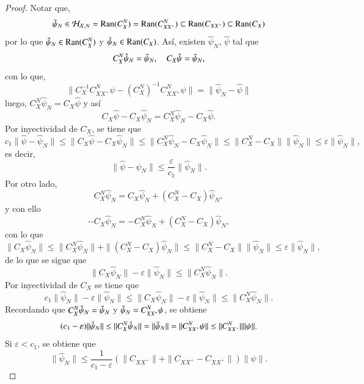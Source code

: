 \begin{proof}
    Notar que,
    \[
    \Tilde{\psi}_N \in 
   \mathcal{H}_{\mathcal{X}, N} = \text{Ran}(C_{X}^N) = \text{Ran}(C_{XX^+}^N) \subseteq \text{Ran}(C_{XX^+}) \subseteq \text{Ran}(C_X)
    \]
    por lo que $\Tilde{\psi}_N \in \text{Ran}(C_{X}^N)$ y $\Tilde{\psi}_N \in \text{Ran}(C_{X})$. Así, existen $\hat{\psi}_N$, $\hat{\psi}$ tal que
    \[
    C_X^N \hat{\psi}_N = \Tilde{\psi}_N, \quad C_X \hat{\psi} = \Tilde{\psi}_N,
    \]
    con lo que,
    \[
    \| C_X^{-1} C_{XX^+}^N \psi - \left (C_X^N \right )^{-1} C_{XX^+}^N \psi \| = \| \hat{\psi}_N - \hat{\psi}\|
    \]
    luego, $C_X^N \hat{\psi}_N = C_X \hat{\psi}$ y así
    \[
    C_X \hat{\psi} - C_X \hat{\psi}_N = C_X^N \hat{\psi}_N - C_X \hat{\psi}.
    \]
    Por inyectividad de $C_X$, se tiene que
    \[
    c_1 \| \hat{\psi} - \hat{\psi}_N \| \leq  \| C_X \hat{\psi} - C_X \hat{\psi}_N \| \leq \| C_X^N \hat{\psi}_N - C_X \hat{\psi}_N \| \leq \| C_X^N - C_X\| \| \hat{\psi}_N \| \leq \varepsilon \| \hat{\psi}_N \|,
    \]
    es decir,
    \[
    \| \hat{\psi} - \hat{\psi}_N \| \leq \frac{\varepsilon}{c_1} \| \hat{\psi}_N \|.
    \]
    Por otro lado, 
    \[
    C_X^N \hat{\psi}_N = C_X \hat{\psi}_N + (C_X^N - C_X) \hat{\psi}_N,
    \]
    y con ello
    \[
    -C_X \hat{\psi}_N = -C_X^N \hat{\psi}_N + (C_X^N - C_X) \hat{\psi}_N,
    \]
    con lo que
    \[
    \| C_X \hat{\psi}_N \| \leq \| C_X^N \hat{\psi}_N \| + \| (C_X^N - C_X) \hat{\psi}_N \| \leq \| C_X^N - C_X \| \| \hat{\psi}_N \| \leq \varepsilon \| \hat{\psi}_N \|,
    \]
    de lo que se sigue que
    \[
    \| C_X \hat{\psi}_N \| - \varepsilon \| \hat{\psi}_N \| \leq \| C_X^N \hat{\psi}_N \|.
    \]
    Por inyectividad de $C_X$ se tiene que
    \[
    c_1 \| \hat{\psi}_N \| - \varepsilon \| \hat{\psi}_N \| \leq \| C_X \hat{\psi}_N \| - \varepsilon \| \hat{\psi}_N \| \leq \| C_X^N \hat{\psi}_N \|.
    \]
    Recordando que $C_X^N \hat{\psi}_N =  \Tilde{\psi}_N$ y $\Tilde{\psi}_N = C_{XX^+}^N \psi$, se obtiene
    \[
    (c_1 - \varepsilon) \| \hat{\psi}_N \| \leq \| C_X^N \hat{\psi}_N \| = \| \Tilde{\psi}_N \| = \| C_{XX^+}^N \psi \| \leq \| C_{XX^+}^N \| \| \psi \|.
    \]
    Si $\varepsilon < c_1$, se obtiene que
    \[
    \| \hat{\psi}_N \| \leq \frac{1}{c_1 - \varepsilon}
    (\| C_{XX^+} \| + \| C_{XX^+} - C_{XX^+} \| ) \| \psi \|.
    \]


\end{proof}
